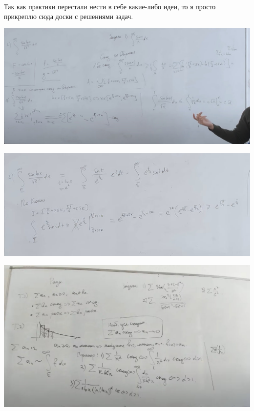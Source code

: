 Так как практики перестали нести в себе какие-либо идеи, то я просто прикреплю сюда доски с решениями задач.

\begin{center}
   \includegraphics[width = 17cm]{assets/12_1.jpg}
\end{center}

\begin{center}
   \includegraphics[width = 17cm]{assets/12_2.jpg}
\end{center}

\begin{center}
   \includegraphics[width = 17cm]{assets/13_1.jpg}
\end{center}